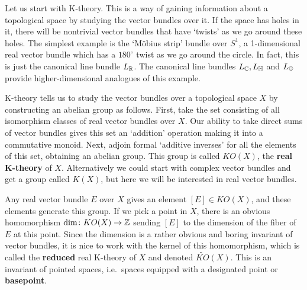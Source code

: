 Let us start with K-theory.   This is a way of gaining information about 
a topological space by studying the vector bundles over it.  If the  
space has holes in it, there will be nontrivial vector bundles that  
have `twists' as we go around these holes.  The simplest example is   
the `M\"obius strip' bundle over $S^1$, a 1-dimensional real vector 
bundle which has a $180^\circ$ twist as we go around the circle.  In  
fact, this is just the canonical line bundle $L_{\mathbb R}$.   The canonical 
line bundles $L_{\mathbb C}, L_{\mathbb H}$ and $L_{\mathbb O}$ provide higher-dimensional 
analogues of this example. 
 
K-theory tells us to study the vector bundles over a topological space
$X$ by constructing an abelian group as follows.  First, take the set
consisting of all isomorphism classes of real vector bundles over $X$.
Our ability to take direct sums of vector bundles gives this set an
`addition' operation making it into a commutative monoid.  Next, adjoin
formal `additive inverses' for all the elements of this set, obtaining
an abelian group.  This group is called $KO(X)$, the {\bf real K-theory}
of $X$.  Alternatively we could start with complex vector bundles and 
get a group called $K(X)$, but here we will be interested in real vector
bundles.
 
Any real vector bundle $E$ over $X$ gives an element $[E] \in KO(X)$, and 
these elements generate this group.  If we pick a point in $X$, there is an
obvious homomorphism $\dim \colon KO(X) \to {\mathbb Z}$ sending $[E]$ to the
dimension of the fiber of $E$ at this point.  Since the dimension is a
rather obvious and boring invariant of vector bundles, it is nice to
work with the kernel of this homomorphism, which is called the {\bf
reduced} real K-theory of $X$ and denoted $\widetilde{KO}(X)$.  This is
an invariant of pointed spaces, i.e.\ spaces equipped with a designated
point or {\bf basepoint}.
 

